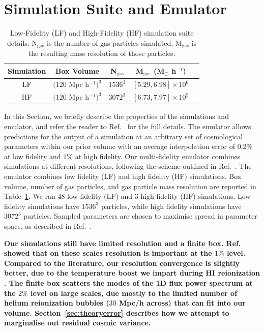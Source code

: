 \section{Simulation Suite and Emulator}
\label{sec:emulator}
\label{sec:simulations}

\begin{table}
	\centering
     \begin{tabular}{|c|c|c|c|c|}
		\hline
		Simulation & Box Volume & N$_{\text{gas}}$ & M$_{\text{gas}}$ (M$_{\odot}$ h$^{-1}$)\\
		\hline
		LF & $(120$ Mpc h$^{-1})^3$ & $1536^3$ & $[5.29, 6.98]\times10^6$\\
		HF & $(120$ Mpc h$^{-1})^3$ & $3072^3$ & $[6.73, 7.97]\times10^5$\\
		\hline
	\end{tabular}
    \caption{\label{table:simulations}
    Low-Fidelity (LF) and High-Fidelity (HF) simulation suite details.
    N$_{\text{gas}}$ is the number of gas particles simulated, M$_{\text{gas}}$ is the resulting mass resolution of those particles.}
\end{table}

In this Section, we briefly describe the properties of the simulations and emulator, and refer the reader to Ref.~\cite{2023simsuite} for the full details.
The emulator allows predictions for the output of a simulation at an arbitrary set of cosmological parameters within our prior volume with an average interpolation error of $0.2\%$ at low fidelity and $1\%$ at high fidelity.
Our multi-fidelity emulator combines simulations at different resolutions, following the scheme outlined in Ref.~\cite{2022MNRAS.517.3200F}.
The emulator combines low fidelity (LF) and high fidelity (HF) simulations.
Box volume, number of gas particles, and gas particle mass resolution are reported in Table~\ref{table:simulations}.
We ran $48$ low fidelity (LF) and $3$ high fidelity (HF) simulations.
Low fidelity simulations have $1536^3$ particles, while high fidelity simulations have $3072^3$ particles.
Sampled parameters are chosen to maximise spread in parameter space, as described in Ref.~\cite{2023simsuite}. 

\textbf{Our simulations still have limited resolution and a finite box. Ref.~\cite{2023simsuite} showed that on these scales resolution is important at the $1\%$ level. Compared to the literature, our resolution convergence is slightly better, due to the temperature boost we impart during HI reionization \cite{2019ApJ...874..154D}. The finite box scatters the modes of the 1D flux power spectrum at the $2\%$ level on large scales, due mostly to the limited number of helium reionization bubbles ($30$ Mpc/h across) that can fit into our volume. Section~\ref{sec:theoryerror} describes how we attempt to marginalise out residual cosmic variance.}

